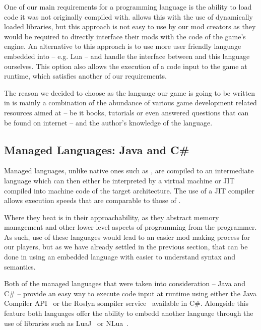 One of our main requirements for a programming language is the ability to load code it was not originally compiled with. \cpp allows this
with the use of dynamically loaded libraries, but this approach is not easy to use by our mod creators as they would be required to
directly interface their mods with the \cpp code of the game's engine. An alternative to this approach is to use more user friendly
language embedded into \cpp -- e.g. Lua -- and handle the interface between \cpp and this language ourselves. This option also
allows the execution of a code input to the game at runtime, which satisfies another of our requirements.

The reason we decided to choose \cpp as the language our game is going to be written in is mainly a combination of the abundance of
various game development related resources aimed at \cpp -- be it books, tutorials or even answered questions that can be found
on internet -- and the author's knowledge of the language.

\subsection{Managed Languages: Java and C\#}

Managed languages, unlike native ones such as \cpp, are compiled to an intermediate language which can then either
be interpreted by a virtual machine or JIT compiled into machine code of the target architecture. The use
of a JIT compiler allows execution speeds that are comparable to those of \cpp.

Where they beat \cpp is in their approachability, as they abstract memory management and other lower level aspects of programming
from the programmer. As such, use of these languages would lead to an easier mod making process for our players, but as
we have already settled in the previous section, that can be done in \cpp using an embedded language with easier to
understand syntax and semantics.

Both of the managed languages that were taken into consideration -- Java and C\# -- provide an easy way to execute code input
at runtime using either the Java Compiler API~\cite{JavaCompAPI} or the Roslyn sompiler service~\cite{Roslyn} available in C\#.
Alongside this feature both languages offer the ability to embedd another language through the use of libraries such as
LuaJ~\cite{LuaJ} or NLua~\cite{NLua}.

